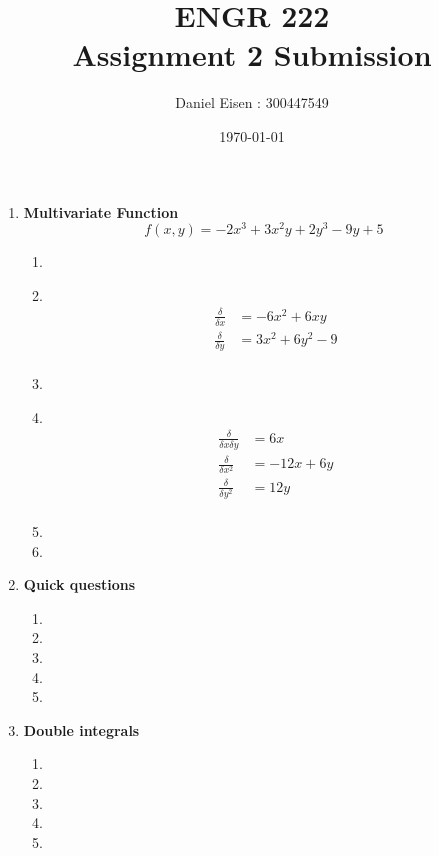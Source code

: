 \documentclass[11pt]{article}
\title{ENGR 222 \\ Assignment 2 Submission}
\author{Daniel Eisen : 300447549}
\date{\today}
\newcommand\Item[1][]{%
  \ifx\relax#1\relax  \item \else \item[#1] \fi
  \abovedisplayskip=0pt\abovedisplayshortskip=0pt~\vspace*{-\baselineskip}}
\begin{document}
\maketitle
\begin{enumerate}
    \item \textbf{Multivariate Function}
          $$f(x,y) = -2x^{3} + 3x^{2}y + 2y^{3} - 9y + 5$$
          \begin{enumerate}
              \Item
              \begin{align*}
                  \frac{\delta}{\delta x} & = -6x^{2} + 6xy       \\
                  \frac{\delta}{\delta y} & = 3x^{2} + 6y^{2} - 9 \\
              \end{align*}
              \Item
              \begin{align*}
                \frac{\delta}{\delta x \delta y} & = 6x \\
                \frac{\delta}{\delta x^{2}} & = -12x + 6y \\
                \frac{\delta}{\delta y^{2}} & = 12y       \\
              \end{align*}
              \item
              \item
          \end{enumerate}
    \item \textbf{Quick questions}
          \begin{enumerate}
              \item
              \item
              \item
              \item
              \item
          \end{enumerate}
    \item \textbf{Double integrals}
          \begin{enumerate}
              \item
              \item
              \item
              \item
              \item

\end{enumerate}
\end{enumerate}
\end{document}
